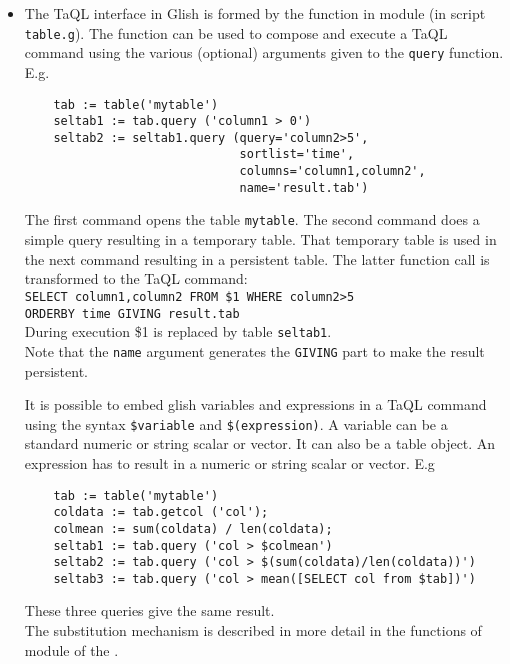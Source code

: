 \begin{itemize}
\item
  The TaQL interface in Glish is formed by the
   function in module
   (in script \texttt{table.g}).
  The function can be used
  to compose and execute a TaQL command using the various (optional)
  arguments given to the \texttt{query} function. E.g.
  \begin{verbatim}
    tab := table('mytable')
    seltab1 := tab.query ('column1 > 0')
    seltab2 := seltab1.query (query='column2>5',
                              sortlist='time',
                              columns='column1,column2',
                              name='result.tab')
  \end{verbatim}
  The first command opens the table \texttt{mytable}.
  The second command does a simple query resulting in a temporary
  table. That temporary table is used in the next command resulting in
  a persistent table. The latter function call is transformed to
  the TaQL command:
  \\\texttt{SELECT column1,column2 FROM \$1 WHERE column2>5}
  \\\texttt{ORDERBY time GIVING result.tab}
  \\During execution \$1 is replaced by table \texttt{seltab1}.
  \\Note that the \texttt{name} argument
  generates the \texttt{GIVING} part to make the result persistent.

  It is possible to embed glish variables and expressions in a TaQL
  command using the syntax \texttt{\$variable} and
  \texttt{\$(expression)}. A variable can be a standard numeric or
  string scalar or vector. It can also be a table object.
  An expression has to result in a numeric or string scalar or vector.
  E.g
  \begin{verbatim}
    tab := table('mytable')
    coldata := tab.getcol ('col');
    colmean := sum(coldata) / len(coldata);
    seltab1 := tab.query ('col > $colmean')
    seltab2 := tab.query ('col > $(sum(coldata)/len(coldata))')
    seltab3 := tab.query ('col > mean([SELECT col from $tab])')
  \end{verbatim}
  These three queries give the same result.
  \\The substitution mechanism is described in more detail in the
  functions of module
   of the
  .
  

\end{itemize}
